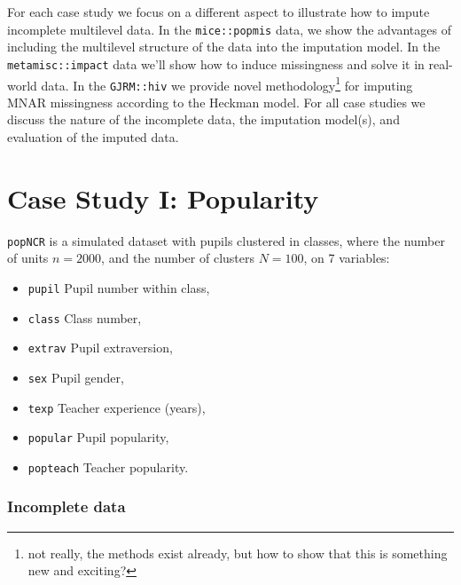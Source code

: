 \documentclass[
]{jss}
\providecommand{\tightlist}{%
  \setlength{\itemsep}{0pt}\setlength{\parskip}{0pt}}
\begin{document}
For each case study we focus on a different aspect to illustrate how to
impute incomplete multilevel data. In the \texttt{mice::popmis} data, we
show the advantages of including the multilevel structure of the data
into the imputation model. In the \texttt{metamisc::impact} data we'll
show how to induce missingness and solve it in real-world data. In the
\texttt{GJRM::hiv} we provide novel methodology\footnote{not really, the
  methods exist already, but how to show that this is something new and
  exciting?} for imputing MNAR missingness according to the Heckman
model. For all case studies we discuss the nature of the incomplete
data, the imputation model(s), and evaluation of the imputed data.

\hypertarget{case-study-i-popularity}{%
\section{Case Study I: Popularity}\label{case-study-i-popularity}}

\texttt{popNCR} is a simulated dataset with pupils clustered in classes,
where the number of units \(n = 2000\), and the number of clusters
\(N = 100\), on 7 variables:

\begin{itemize}
\tightlist
\item
  \texttt{pupil} Pupil number within class,
\item
  \texttt{class} Class number,
\item
  \texttt{extrav} Pupil extraversion,
\item
  \texttt{sex} Pupil gender,
\item
  \texttt{texp} Teacher experience (years),
\item
  \texttt{popular} Pupil popularity,
\item
  \texttt{popteach} Teacher popularity.
\end{itemize}

\hypertarget{incomplete-data}{%
\subsubsection{Incomplete data}\label{incomplete-data}}
\end{document}

